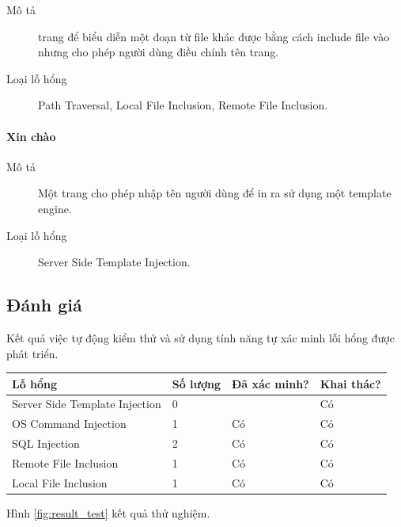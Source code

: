 \documentclass[./../main.tex]{subfiles}
\begin{document}
\begin{description}
	\item[Mô tả] trang để biểu diễn một đoạn từ file khác được bằng cách include file vào nhưng cho phép người dùng điều chính tên trang.
	\item[Loại lỗ hổng] Path Traversal, Local File Inclusion, Remote File Inclusion.
\end{description}

\paragraph{Xin chào}

\begin{description}
	\item[Mô tả] Một trang cho phép nhập tên người dùng để in ra sử dụng một template engine.
	\item[Loại lỗ hổng] Server Side Template Injection.
\end{description}

\subsection{Đánh giá}

Kết quả việc tự động kiểm thử và sử dụng tính năng tự xác minh lỗi hổng được phát triển.

\begin{table}[]
	\begin{tabular}{|l|l|l|l|}
		\hline
		\textbf{Lỗ hổng}               & \textbf{Số lượng} & \textbf{Đã xác minh?} & \textbf{Khai thác?} \\ \hline
		Server Side Template Injection & 0                 &                       & Có                  \\ \hline
		OS Command Injection           & 1                 & Có                    & Có                  \\ \hline
		SQL Injection                  & 2                 & Có                    & Có                  \\ \hline
		Remote File Inclusion          & 1                 & Có                    & Có                  \\ \hline
		Local File Inclusion           & 1                 & Có                    & Có                  \\ \hline
	\end{tabular}
\end{table}
Hình \ref{fig:result_test} kết quả thử nghiệm.
\end{document}
